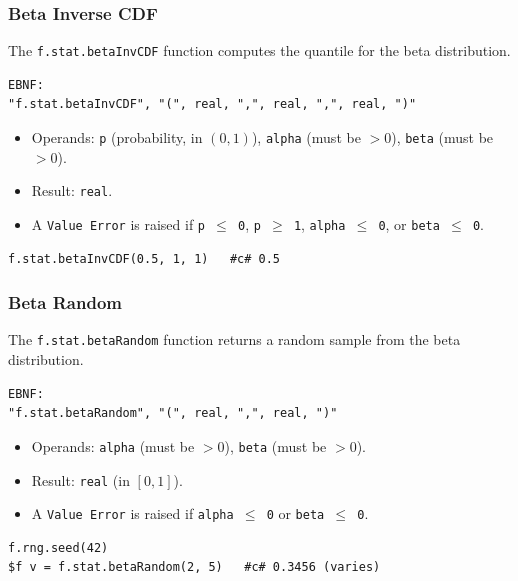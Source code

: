 \subsubsection{Beta Inverse CDF}
The \texttt{f.stat.betaInvCDF} function computes the quantile for the beta distribution.
\begin{verbatim}
EBNF:
"f.stat.betaInvCDF", "(", real, ",", real, ",", real, ")"
\end{verbatim}
\begin{itemize}
\item Operands: \texttt{p} (probability, in $(0, 1)$), \texttt{alpha} (must be $> 0$), \texttt{beta} (must be $> 0$).
\item Result: \texttt{real}.
\item A \texttt{Value Error} is raised if \texttt{p $\leq$ 0}, \texttt{p $\geq$ 1}, \texttt{alpha $\leq$ 0}, or \texttt{beta $\leq$ 0}.
\end{itemize}
\begin{verbatim}
f.stat.betaInvCDF(0.5, 1, 1)   #c# 0.5
\end{verbatim}

\subsubsection{Beta Random}
The \texttt{f.stat.betaRandom} function returns a random sample from the beta distribution.
\begin{verbatim}
EBNF:
"f.stat.betaRandom", "(", real, ",", real, ")"
\end{verbatim}
\begin{itemize}
\item Operands: \texttt{alpha} (must be $> 0$), \texttt{beta} (must be $> 0$).
\item Result: \texttt{real} (in $[0, 1]$).
\item A \texttt{Value Error} is raised if \texttt{alpha $\leq$ 0} or \texttt{beta $\leq$ 0}.
\end{itemize}
\begin{verbatim}
f.rng.seed(42)
$f v = f.stat.betaRandom(2, 5)   #c# 0.3456 (varies)
\end{verbatim}

